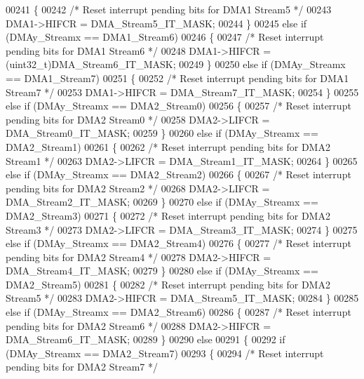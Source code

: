 \begin{DoxyCode}
00241   \{
00242     \textcolor{comment}{/* Reset interrupt pending bits for DMA1 Stream5 */}
00243     DMA1->HIFCR = DMA_Stream5_IT_MASK;
00244   \}
00245   \textcolor{keywordflow}{else} \textcolor{keywordflow}{if} (DMAy\_Streamx == DMA1_Stream6)
00246   \{
00247     \textcolor{comment}{/* Reset interrupt pending bits for DMA1 Stream6 */}
00248     DMA1->HIFCR = (uint32\_t)DMA_Stream6_IT_MASK;
00249   \}
00250   \textcolor{keywordflow}{else} \textcolor{keywordflow}{if} (DMAy\_Streamx == DMA1_Stream7)
00251   \{
00252     \textcolor{comment}{/* Reset interrupt pending bits for DMA1 Stream7 */}
00253     DMA1->HIFCR = DMA_Stream7_IT_MASK;
00254   \}
00255   \textcolor{keywordflow}{else} \textcolor{keywordflow}{if} (DMAy\_Streamx == DMA2_Stream0)
00256   \{
00257     \textcolor{comment}{/* Reset interrupt pending bits for DMA2 Stream0 */}
00258     DMA2->LIFCR = DMA_Stream0_IT_MASK;
00259   \}
00260   \textcolor{keywordflow}{else} \textcolor{keywordflow}{if} (DMAy\_Streamx == DMA2_Stream1)
00261   \{
00262     \textcolor{comment}{/* Reset interrupt pending bits for DMA2 Stream1 */}
00263     DMA2->LIFCR = DMA_Stream1_IT_MASK;
00264   \}
00265   \textcolor{keywordflow}{else} \textcolor{keywordflow}{if} (DMAy\_Streamx == DMA2_Stream2)
00266   \{
00267     \textcolor{comment}{/* Reset interrupt pending bits for DMA2 Stream2 */}
00268     DMA2->LIFCR = DMA_Stream2_IT_MASK;
00269   \}
00270   \textcolor{keywordflow}{else} \textcolor{keywordflow}{if} (DMAy\_Streamx == DMA2_Stream3)
00271   \{
00272     \textcolor{comment}{/* Reset interrupt pending bits for DMA2 Stream3 */}
00273     DMA2->LIFCR = DMA_Stream3_IT_MASK;
00274   \}
00275   \textcolor{keywordflow}{else} \textcolor{keywordflow}{if} (DMAy\_Streamx == DMA2_Stream4)
00276   \{
00277     \textcolor{comment}{/* Reset interrupt pending bits for DMA2 Stream4 */}
00278     DMA2->HIFCR = DMA_Stream4_IT_MASK;
00279   \}
00280   \textcolor{keywordflow}{else} \textcolor{keywordflow}{if} (DMAy\_Streamx == DMA2_Stream5)
00281   \{
00282     \textcolor{comment}{/* Reset interrupt pending bits for DMA2 Stream5 */}
00283     DMA2->HIFCR = DMA_Stream5_IT_MASK;
00284   \}
00285   \textcolor{keywordflow}{else} \textcolor{keywordflow}{if} (DMAy\_Streamx == DMA2_Stream6)
00286   \{
00287     \textcolor{comment}{/* Reset interrupt pending bits for DMA2 Stream6 */}
00288     DMA2->HIFCR = DMA_Stream6_IT_MASK;
00289   \}
00290   \textcolor{keywordflow}{else}
00291   \{
00292     \textcolor{keywordflow}{if} (DMAy\_Streamx == DMA2_Stream7)
00293     \{
00294       \textcolor{comment}{/* Reset interrupt pending bits for DMA2 Stream7 */}

\end{DoxyCode}
